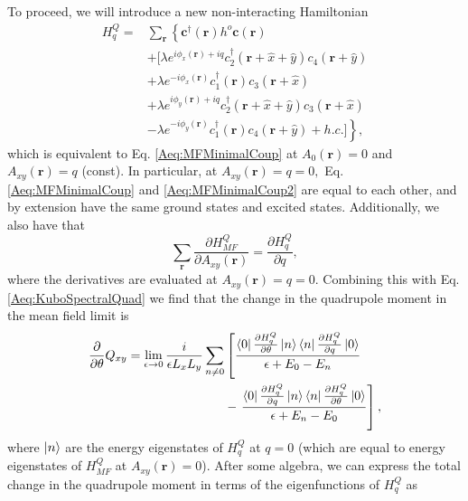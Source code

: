 \documentclass[prb,aps,twocolumn,groupaddress,floatfix]{revtex4-1}
\begin{document}
To proceed, we will introduce a new non-interacting Hamiltonian
\begin{equation}
\begin{split}
H^{Q}_{q} = &\sum_{\bm{r}} \left\{\bm{c}^\dagger(\bm{r}) h^o \bm{c}(\bm{r}) \right.\\&+[\lambda e^{i\phi_x(\bm{r}) + i q}c_2^\dagger(\bm{r}+\hat{x}+\hat{y})c_4(\bm{r}+\hat{y})\\& + \lambda e^{-i\phi_x(\bm{r}) } c_1^\dagger(\bm{r})c_3(\bm{r}+\hat{x}) \\&+\lambda e^{i\phi_y(\bm{r}) + i q}c_2^\dagger(\bm{r}+\hat{x}+\hat{y})c_3(\bm{r}+\hat{x})\\ &- \left.\lambda e^{-i\phi_y(\bm{r}) }c_1^\dagger(\bm{r})c_4(\bm{r}+\hat{y}) + h.c.]\right\},
\end{split}\label{Aeq:MFMinimalCoup2}
\end{equation}
which is equivalent to Eq. \ref{Aeq:MFMinimalCoup} at $A_0(\bm{r}) = 0$ and $A_{xy}(\bm{r}) = q$ (const). In particular, at $A_{xy}(\bm{r}) = q = 0,$ Eq. \ref{Aeq:MFMinimalCoup} and \ref{Aeq:MFMinimalCoup2} are equal to each other, and by extension have the same ground states and excited states. Additionally, we also have that
\begin{equation}
\sum_{\bm{r}}\frac{\partial H^Q_{MF}}{\partial{A_{xy}(\bm{r})}} = \frac{\partial H^Q_{q}}{\partial q},
\end{equation}
where the derivatives are evaluated at $A_{xy}(\bm{r}) = q= 0$. Combining this with Eq. \ref{Aeq:KuboSpectralQuad} we find that the change in the quadrupole moment in the mean field limit is
\begin{equation}
\begin{split}
\frac{\partial}{\partial \theta} Q_{xy} = \lim_{\epsilon \rightarrow 0}\frac{i}{\epsilon L_x L_y}\sum_{n\neq 0}&\left[\frac{\bra{0} \frac{\partial H^Q_{q}}{\partial\theta}\ket{n}\bra{n} \frac{\partial H^Q_{q}}{\partial q}\ket{0}}{\epsilon + E_0 - E_n}\right. \\ & - \left. \frac{\bra{0}  \frac{\partial H^Q_{q}}{\partial q}\ket{n}\bra{n} \frac{\partial H^Q_{q}}{\partial\theta} \ket{0}}{\epsilon + E_n - E_0}\right],
\label{Aeq:KuboSpectralQuad2}
\end{split}
\end{equation}
where $\ket{n}$ are the energy eigenstates of $H^Q_{q}$ at $q= 0$ (which are equal to energy eigenstates of $H^Q_{MF}$ at $A_{xy}(\bm{r}) = 0$). After some algebra, we can express the total change in the quadrupole moment in terms of the eigenfunctions of $H^Q_{q}$ as
\end{document}
